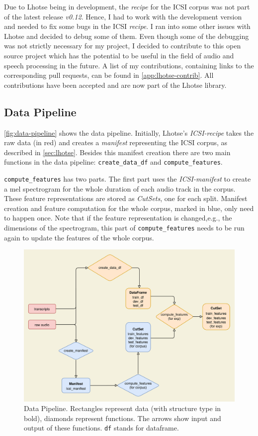 \documentclass[bsc,frontabs,parskip,deptreport]{infthesis}
\begin{document}
Due to Lhotse being in development, the \textit{recipe} for the ICSI corpus was not part of the latest release \textit{v0.12}. Hence, I had to work with the development version and needed to fix some bugs in the ICSI \textit{recipe}. 
I ran into some other issues with Lhotse and decided to debug some of them. Even though some of the debugging was not strictly necessary for my project, I decided to contribute to this open source project which has the potential to be useful in the field of audio and speech processing in the future. A list of my contributions, containing links to the corresponding pull requests, can be found in \autoref{app:lhotse-contrib}. All contributions have been accepted and are now part of the Lhotse library.

\subsection{Data Pipeline} \label{sec:ml-data-pipeline}

\autoref{fig:data-pipeline} shows the data pipeline.
Initially, Lhotse's \textit{ICSI-recipe} takes the raw data (in red) and creates a \textit{manifest} representing the ICSI corpus, as described in \autoref{sec:lhotse}.
Besides this manifest creation there are two main functions in the data pipeline: \verb|create_data_df| and \verb|compute_features|.

\verb|compute_features| has two parts.
The first part uses the \textit{ICSI-manifest} to create a mel spectrogram for the whole duration of each audio track in the corpus. These feature representations are stored as \textit{CutSets}, one for each split.
Manifest creation and feature computation for the whole corpus, marked in blue, only need to happen once.
Note that if the feature representation is changed,e.g., the dimensions of the spectrogram, this part of \verb|compute_features| needs to be run again to update the features of the whole corpus.


\begin{figure}[h!]
    \centering
    \includegraphics[width=15cm]{imgs/diagrams/Pipeline.drawio.png}
    \caption{Data Pipeline. Rectangles represent data (with structure type in bold), diamonds represent functions. The arrows show input and output of these functions. \texttt{df} stands for dataframe.}
    \label{fig:data-pipeline}
\end{figure}
\end{document}
